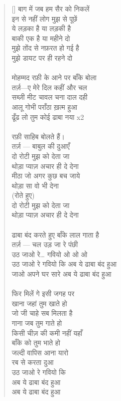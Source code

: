\begin{verse}[\versewidth]
{बाग में जब हम सैर को निकलें\\
इन से नहीं लोग मुझ से पूछें\\
ये लड़का है या लड़की है\\
बाकी एक है या महीने दो\\
मुझे तोंद से नफ़रत हो गई है\\
मुझे डायट पर ही रहने दो\\
\\
मोहम्मद रफ़ी के आने पर बाँके बोला\\
तर्ज़—ए मेरे दिल कहीं और चल\\
सब्ज़ी मीट चावल चना दाल दही\\
आलू गोभी पराँठा ख़त्म हुआ\\
ढूँढ लो तुम कोई ढाबा नया x2\\
\\
रफ़ी साहिब बोलते हैं।\\
तर्ज़ — बाबुल की दुआएँ\\
दो रोटी मुझ को देता जा\\
थोड़ा प्याज़ अचार ही दे देना\\
मीठा जो अगर कुछ बच जाये\\
थोड़ा सा वो भी देना\\
(रोते हुए)\\
दो रोटी मुझ को देता जा\\
थोड़ा प्याज़ अचार ही दे देना\\
\\
ढाबा बंद करते हुए बाँके लाल गाता है\\
तर्ज़ — चल उड़ जा रे पंछी\\
उठ जाओ रे… गवियो ओ ओ ओ\\
उठ जाओ रे गवियो कि अब ये ढाबा बंद हुआ\\
जाओ अपने घर सारे अब ये ढाबा बंद हुआ\\
\\
फिर मिलें गे इसी जगह पर\\
खाना जहां तुम खाते हो\\
जो जी चाहे सब मिलता है\\
गाना जब तुम गाते हो\\
किसी चीज़ की कमी नहीं यहाँ\\
बाँके को तुम भाते हो\\
जल्दी वापिस आना यारो\\
रब से करता दुआ\\
उठ जाओ रे गवियो कि\\
अब ये ढाबा बंद हुआ\\
अब ये ढाबा बंद हुआ
}\end{verse}

